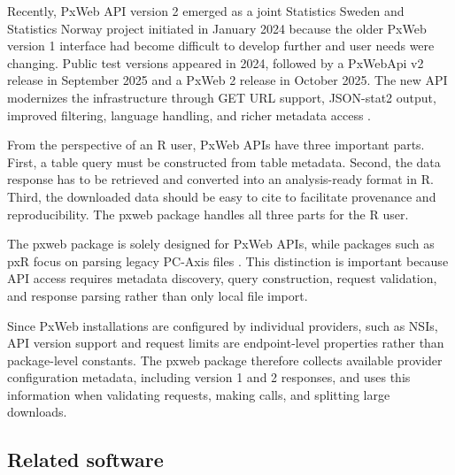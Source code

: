 \documentclass[11pt]{article}
\DeclareRobustCommand{\pkg}[1]{\textsf{#1}}
\DeclareRobustCommand{\proglang}[1]{\textsf{#1}}
\DeclareRobustCommand{\code}[1]{\texttt{\detokenize{#1}}}
\begin{document}
Recently, PxWeb API version 2 emerged as a joint Statistics Sweden and Statistics Norway project initiated in January 2024 because the older PxWeb version 1 interface had become difficult to develop further and user needs were changing.
Public test versions appeared in 2024, followed by a PxWebApi v2 release in September 2025 and a PxWeb 2 release in October 2025.
The new API modernizes the infrastructure through GET URL support, JSON-stat2 output, improved filtering, language handling, and richer metadata access \citep{PxToolsPxWeb2Process,PxToolsPxWeb2Plans,PxToolsPxWebApi2UserGuide}.

From the perspective of an \proglang{R} user, PxWeb APIs have three important parts.
First, a table query must be constructed from table metadata.
Second, the data response has to be retrieved and converted into an analysis-ready format in \proglang{R}.
Third, the downloaded data should be easy to cite to facilitate provenance and reproducibility.
The \pkg{pxweb} package handles all three parts for the \proglang{R} user.

The \pkg{pxweb} package is solely designed for PxWeb APIs, while packages such as \pkg{pxR} focus on parsing legacy PC-Axis files \citep{pxR}.
This distinction is important because API access requires metadata discovery, query construction, request validation, and response parsing rather than only local file import.

Since PxWeb installations are configured by individual providers, such as NSIs, API version support and request limits are endpoint-level properties rather than package-level constants.
The \pkg{pxweb} package therefore collects available provider configuration metadata, including version 1 and 2 \code{config} responses, and uses this information when validating requests, making calls, and splitting large downloads.

\subsection{Related software}
\label{sec:related}
\end{document}
